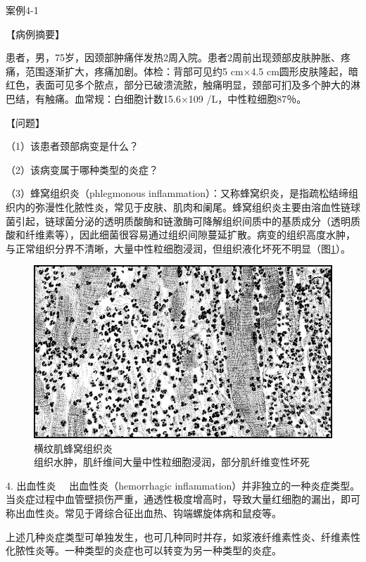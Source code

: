 \begin{framed}
{案例4-1}

{【病例摘要】}

患者，男，75岁，因颈部肿痛伴发热2周入院。患者2周前出现颈部皮肤肿胀、疼痛，范围逐渐扩大，疼痛加剧。体检：背部可见约5
cm×4.5
cm圆形皮肤隆起，暗红色，表面可见多个脓点，部分已破溃流脓，触痛明显，颈部可扪及多个肿大的淋巴结，有触痛。血常规：白细胞计数15.6×10{9}
/L，中性粒细胞87％。

{【问题】}

（1）该患者颈部病变是什么？

（2）该病变属于哪种类型的炎症？
\end{framed}

（3）蜂窝组织炎（phlegmonous
inflammation）：又称蜂窝织炎，是指疏松结缔组织内的弥漫性化脓性炎，常见于皮肤、肌肉和阑尾。蜂窝组织炎主要由溶血性链球菌引起，链球菌分泌的透明质酸酶和链激酶可降解组织间质中的基质成分（透明质酸和纤维素等），因此细菌很容易通过组织间隙蔓延扩散。病变的组织高度水肿，与正常组织分界不清晰，大量中性粒细胞浸润，但组织液化坏死不明显（图\ref{fig4-11}）。

\begin{figure}[!htbp]
 \centering
 \includegraphics{./images/Image00062.jpg}
 \caption{横纹肌蜂窝组织炎 \\ {\small 组织水肿，肌纤维间大量中性粒细胞浸润，部分肌纤维变性坏死}}
 \label{fig4-11}
  \end{figure} 



{4. 出血性炎} 　出血性炎（hemorrhagic
inflammation）并非独立的一种炎症类型。当炎症过程中血管壁损伤严重，通透性极度增高时，导致大量红细胞的漏出，即可称出血性炎。常见于肾综合征出血热、钩端螺旋体病和鼠疫等。

上述几种炎症类型可单独发生，也可几种同时并存，如浆液纤维素性炎、纤维素性化脓性炎等。一种类型的炎症也可以转变为另一种类型的炎症。

